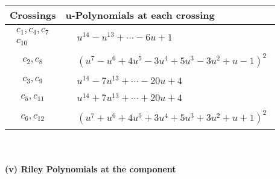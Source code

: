 \documentclass[1p]{elsarticle_modified}
\theoremstyle{definition}
\begin{document}
\begin{tabular}{m{50pt}|m{274pt}}
Crossings & \hspace{64pt}u-Polynomials at each crossing \\
\hline $$\begin{aligned}c_{1},c_{4},c_{7}\\c_{10}\end{aligned}$$&$\begin{aligned}
&u^{14}- u^{13}+\cdots-6 u+1
\end{aligned}$\\
\hline $$\begin{aligned}c_{2},c_{8}\end{aligned}$$&$\begin{aligned}
&(u^7- u^6+4 u^5-3 u^4+5 u^3-3 u^2+u-1)^2
\end{aligned}$\\
\hline $$\begin{aligned}c_{3},c_{9}\end{aligned}$$&$\begin{aligned}
&u^{14}-7 u^{13}+\cdots-20 u+4
\end{aligned}$\\
\hline $$\begin{aligned}c_{5},c_{11}\end{aligned}$$&$\begin{aligned}
&u^{14}+7 u^{13}+\cdots+20 u+4
\end{aligned}$\\
\hline $$\begin{aligned}c_{6},c_{12}\end{aligned}$$&$\begin{aligned}
&(u^7+u^6+4 u^5+3 u^4+5 u^3+3 u^2+u+1)^2
\end{aligned}$\\
\hline
\end{tabular}\\~\\
\newpage\renewcommand{\arraystretch}{1}
\flushleft \textbf{(v) Riley Polynomials at the component}\newline \\
\end{document}

